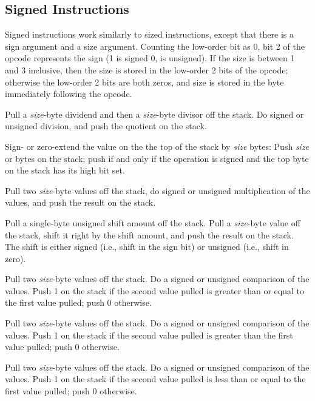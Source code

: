 \documentclass[10pt]{article}
\begin{document}
\subsection{Signed Instructions}

Signed instructions work similarly to sized instructions, except that
there is a sign argument and a size argument.  Counting the low-order
bit as 0, bit 2 of the opcode represents the sign (1 is signed 0, is
unsigned).  If the size is between 1 and 3 inclusive, then the size is
stored in the low-order 2 bits of the opcode; otherwise the low-order
2 bits are both zeros, and size is stored in the byte immediately
following the opcode.

 Pull a \emph{size}-byte
dividend and then a \emph{size}-byte divisor off the stack.  Do signed
or unsigned division, and push the quotient on the stack.

 Sign- or zero-extend the
value on the the top of the stack by \emph{size} bytes: Push
\emph{size}  or  bytes on the stack; push
 if and only if the operation is signed and the top byte on
the stack has its high bit set.

 Pull two \emph{size}-byte
values off the stack, do signed or unsigned multiplication of the
values, and push the result on the stack.

 Pull a single-byte
unsigned shift amount off the stack.  Pull a \emph{size}-byte value
off the stack, shift it right by the shift amount, and push the result
on the stack.  The shift is either signed (i.e., shift in the sign
bit) or unsigned (i.e., shift in zero).

 Pull two
\emph{size}-byte values off the stack. Do a signed or unsigned
comparison of the values.  Push 1 on the stack if the second value
pulled is greater than or equal to the first value pulled; push 0
otherwise.

 Pull two
\emph{size}-byte values off the stack. Do a signed or unsigned
comparison of the values.  Push 1 on the stack if the second value
pulled is greater than the first value pulled; push 0 otherwise.

 Pull two
\emph{size}-byte values off the stack. Do a signed or unsigned
comparison of the values.  Push 1 on the stack if the second value
pulled is less than or equal to the first value pulled; push 0
otherwise.
\end{document}
